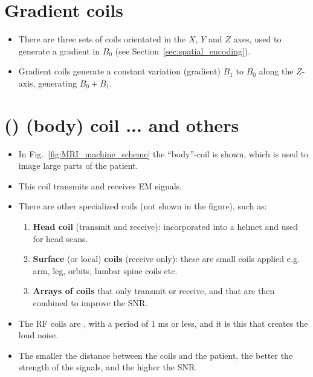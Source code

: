 \section{Gradient coils}
\begin{itemize}
\item There are three sets of coils orientated in the $X$, $Y$ and $Z$
  axes, used to generate a gradient in $B_0$ (see
  Section~\ref{sec:spatial_encoding}).
\item Gradient coils generate a constant variation (gradient) $B_1$ to
  $B_0$ along the $Z$-axis, generating $B_0+B_1$.
\end{itemize}

\section{ () (body) coil ... and others}
\begin{itemize}
\item In Fig.~\ref{fig:MRI_machine_scheme} the ``body''-coil is shown,
  which is used to image large parts of the patient.
\item This coil transmits and receives \gls{EM} signals.
\item There are other specialized coils (not shown in the figure),
  such as:
  \begin{enumerate}
  \item \textbf{Head coil} (transmit and receive): incorporated into a
    helmet and used for head scans.
  \item \textbf{Surface} (or local) \textbf{coils} (receive only):
    these are small coils applied  e.g. arm, leg,
    orbits, lumbar spine coils etc.
  \item \textbf{Arrays of coils} that only transmit or receive, and that are
    then combined to improve the SNR.
  \end{enumerate}
\item The RF \cite{wikipedia_RF} coils are , with
  a period of 1 ms or less, and it is this that creates the loud
  noise.
\item The smaller the distance between the coils and the patient, the
  better the strength of the signals, and the higher the \gls{SNR}.
\end{itemize}

